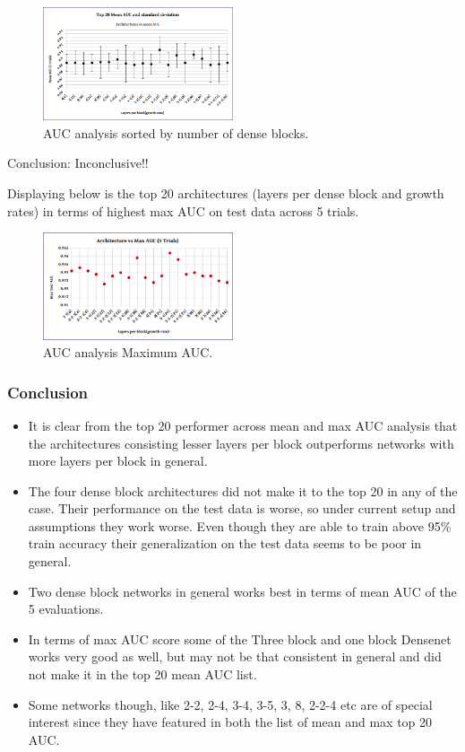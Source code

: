 \begin{figure}[ht]
\centering
\includegraphics[width=0.5\textwidth]{images/densenet/auc_analysis_sortedby_denseblocks.png}
\caption{\label{fig:meanAUC_blocks}AUC analysis sorted by number of dense blocks.}
\end{figure}
Conclusion: Inconclusive!!\\
\flushbottom
\newpage

Displaying below is the top 20 architectures (layers per dense block and growth rates) in terms of highest max AUC on test data across 5 trials. 
\begin{figure}[ht]
\centering
\includegraphics[width=0.5\textwidth]{images/densenet/auc_analysis_max_auc.png}
\caption{\label{fig:maxAUC_five}AUC analysis Maximum AUC.}
\end{figure}

\subsubsection{Conclusion}
\begin{itemize}
 \item It is clear from the top 20 performer across mean and max AUC analysis that the architectures consisting lesser layers per block outperforms networks with more layers per block in general. 
 \item The four dense block architectures did not make it to the top 20 in any of the case. Their performance on the test data is worse, so under current setup and assumptions they work worse.
 Even though they are able to train above 95\% train accuracy their generalization on the test data seems to be poor in general.
 \item Two dense block networks in general works best in terms of mean AUC of the 5 evaluations.
 \item In terms of max AUC score some of the Three block and one block Densenet works very good as well, but may not be that consistent in general and did not make it in the top 20 mean AUC list.
 \item Some networks though, like 2-2, 2-4, 3-4, 3-5, 3, 8, 2-2-4 etc are of special interest since they have featured in both the list of mean and max top 20 AUC.
\end{itemize}

